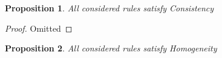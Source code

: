 \documentclass{article}
\newtheorem{mytheorem}{Proposition}
\begin{document}

\begin{mytheorem}
All considered rules satisfy Consistency
\end{mytheorem}

\begin{proof}\renewcommand{\qedsymbol}{}
Omitted %
\end{proof}
\begin{mytheorem}
All considered rules satisfy Homogeneity
\end{mytheorem}
\end{document}
